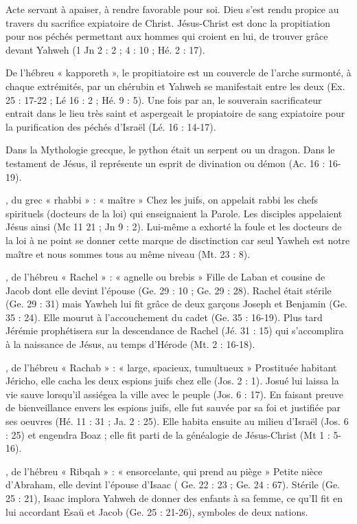 \begin{multicols}{2}
Acte servant à apaiser, à rendre favorable pour soi.
Dieu s'est rendu propice au travers du sacrifice expiatoire de Christ.
Jésus-Christ est donc la propitiation pour nos péchés permettant aux hommes qui croient en lui, de trouver grâce devant Yahweh (1 Jn 2 : 2 ; 4 : 10 ; Hé. 2 : 17).


De l'hébreu « kapporeth », le propitiatoire est un couvercle de l'arche surmonté, à chaque extrémités, par un chérubin et Yahweh se manifestait entre les deux (Ex. 25 : 17-22 ; Lé 16 : 2 ; Hé. 9 : 5). Une fois par an, le souverain sacrificateur entrait dans le lieu très saint et aspergeait le propiatoire de sang expiatoire pour la purification des péchés d'Israël (Lé. 16 : 14-17).


Dans la Mythologie grecque, le python était un serpent ou un dragon.
Dans le testament de Jésus, il représente un esprit de divination ou démon (Ac. 16 : 16-19).


, du grec « rhabbi » : « maître »
Chez les juifs, on appelait rabbi les chefs spirituels (docteurs de la loi) qui enseignaient la Parole. Les disciples appelaient Jésus ainsi (Mc 11 21 ; Jn 9 : 2). Lui-même a exhorté la foule et les docteurs de la loi à ne point se donner cette marque de disctinction car seul Yawheh est notre maître et nous sommes tous au même niveau (Mt. 23 : 8).


, de l'hébreu « Rachel » : « agnelle ou brebis »
Fille de Laban et cousine de Jacob dont elle devint l'épouse (Ge. 29 : 10 ; Ge. 29 : 28). Rachel était stérile (Ge. 29 : 31) mais Yawheh lui fit grâce de deux garçons Joseph et Benjamin (Ge. 35 : 24). Elle mourut à l'accouchement du cadet (Ge. 35 : 16-19). Plus tard Jérémie prophétisera sur la descendance de Rachel (Jé. 31 : 15) qui s'accomplira à la naissance de Jésus, au temps d'Hérode (Mt. 2 : 16-18).


, de l'hébreu « Rachab » : « large, spacieux, tumultueux »
Prostituée habitant Jéricho, elle cacha les deux espions juifs chez elle (Jos. 2 : 1). Josué lui laissa la vie sauve lorsqu'il assiégea la ville avec le peuple (Jos. 6 : 17). En faisant preuve de bienveillance envers les espions juifs, elle fut sauvée par sa foi et justifiée par ses oeuvres (Hé. 11 : 31 ; Ja. 2 : 25). Elle habita ensuite au milieu d'Israël (Jos. 6 : 25) et engendra Boaz ; elle fit parti de la généalogie de Jésus-Christ (Mt 1 : 5-16).


, de l'hébreu « Ribqah » : « ensorcelante, qui prend au piège »
Petite nièce d'Abraham, elle devint l'épouse d'Isaac ( Ge. 22 : 23 ; Ge. 24 : 67). Stérile (Ge. 25 : 21), Isaac implora Yahweh de donner des enfants à sa femme, ce qu'Il fit en lui accordant Esaü et Jacob (Ge. 25 : 21-26), symboles de deux nations.



\end{multicols}

